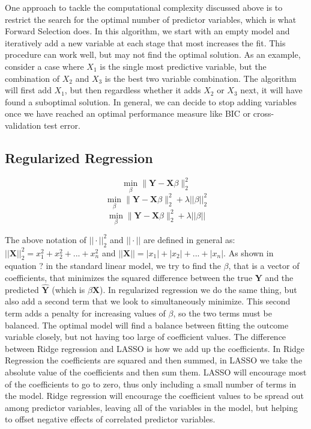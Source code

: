 \documentclass{article}
\newcommand{\bX}{\mathbf{X}}
\newcommand{\bY}{\mathbf{Y}}
\begin{document}
One approach to tackle the computational complexity discussed above is to restrict the search for the optimal number of 
predictor variables, which is what Forward Selection does. In this algorithm, we start with an empty model and iteratively add a 
new variable at each stage that most increases the fit. This procedure can work well, but may not find the optimal solution. As 
an example, consider a case where $X_1$ is the single most predictive variable, but the combination of $X_2$ and $X_3$ is 
the best two variable combination. The algorithm will first add $X_1$, but then regardless whether it adds $X_2$ or $X_3$ next, 
it will have found a suboptimal solution. In general, we can decide to stop adding variables once we have reached an optimal 
performance measure like BIC or cross-validation test error.


\subsection{Regularized Regression}

	\[\min_{\beta}  \|\bY - \bX\beta\|_{2}^{2} \tag{linear model}\]
	\[\min_{\beta}  \|\bY - \bX\beta\|_{2}^{2} + \lambda||\beta||_2^2 \tag{ridge regression}\]
	\[\min_{\beta}  \|\bY - \bX\beta\|_{2}^{2} + \lambda||\beta|| \tag{LASSO}\]

The above notation of $||\cdot||_{2}^{2}$ and  $||\cdot||$ are defined in general as: $||\bX||_{2}^{2} = x_1^2 + x_2^2 + ... + 
x_n^2$ and $||\bX|| = |x_1| + |x_2| + ... + |x_n|$. As shown in equation ? in the standard linear model, we try to find the $\beta$, that is a vector of coefficients,  
that minimizes the squared difference between the true $\bY$ and the predicted $\hat{\bY}$ (which is $\beta\bX$). In 
regularized regression we do the same thing, but also add a second term that we look to simultaneously minimize. This second 
term adds a penalty for increasing values of $\beta$, so the two terms must be balanced. The optimal model will find a balance 
between fitting the outcome variable closely, but not having too large of coefficient values. The difference between Ridge 
regression and LASSO is how we add up the coefficients. In Ridge Regression the coefficients are squared and then summed, 
in LASSO we take the absolute value of 
the coefficients and then sum them. LASSO will encourage most of the coefficients to go to zero, thus only including a small 
number of terms in the model. Ridge regression will encourage the coefficient values to be spread out among predictor 
variables, leaving all of the variables in the model, but helping to offset negative effects of correlated predictor variables. 
\end{document}
